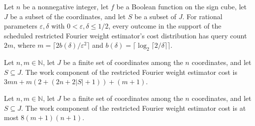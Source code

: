 \begin{theorem}
\label{FABL.scheduledRestrictedFourierWeightEstimatorProgram_queries_eq}
\leanok
{}
Let $n$ be a nonnegative integer, let $f$ be a Boolean function on the sign cube, let
$J$ be a subset of the coordinates, and let $S$ be a subset of $J$. For rational
parameters $\varepsilon,\delta$ with $0<\varepsilon,\delta\le 1/2$, every outcome in the
support of the scheduled restricted Fourier weight estimator's cost distribution has
query count $2m$, where $m=\lceil2b(\delta)/\varepsilon^2\rceil$ and
$b(\delta)=\lceil\log_2\lceil2/\delta\rceil\rceil$.
\end{theorem}

\begin{theorem}
\label{FABL.restrictedFourierWeightEstimatorCost_work}
\leanok
{}
Let $n,m\in\mathbb N$, let $J$ be a finite set of coordinates among the $n$ coordinates,
and let $S\subseteq J$. The work component of the restricted Fourier weight estimator
cost is $3mn+m(2+(2n+2|S|+1))+(m+1)$.
\end{theorem}

\begin{theorem}
\label{FABL.restrictedFourierWeightEstimatorCost_work_le}
\leanok
{}
Let $n,m\in\mathbb N$, let $J$ be a finite set of coordinates among the $n$ coordinates,
and let $S\subseteq J$. The work component of the restricted Fourier weight estimator
cost is at most $8(m+1)(n+1)$.
\end{theorem}

